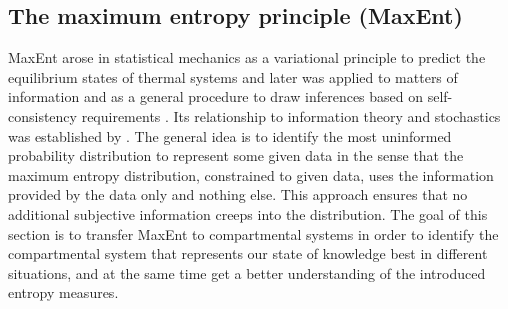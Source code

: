 \documentclass[smallextended]{svjour3}
\renewcommand{\P}{\mathbb{P}}
\begin{document}
\subsection{The maximum entropy principle (MaxEnt)}
% 

MaxEnt arose in statistical mechanics as a variational principle to predict the equilibrium states of thermal systems and later was applied to matters of information and as a general procedure to draw inferences based on self-consistency requirements \citep{Presse2013RMP}.
Its relationship to information theory and stochastics was established by \citet{Jaynes1957PR1, Jaynes1957PR2}.
The general idea is to identify the most uninformed probability distribution to represent some given data in the sense that the maximum entropy distribution, constrained to given data, uses the information provided by the data only and nothing else.
This approach ensures that no additional subjective information creeps into the distribution.
The goal of this section is to transfer MaxEnt to compartmental systems in order to identify the compartmental system that represents our state of knowledge best in different situations, and at the same time get a better understanding of the introduced entropy measures.
\end{document}
